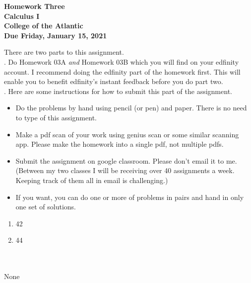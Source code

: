 \documentclass[12pt]{article}
\begin{document}
\pagestyle{empty}
 
\begin{center}
{\LARGE {\bf Homework Three}}\\
\bigskip
{\Large {\bf Calculus I}}\\
\bigskip
{\Large {\bf College of the Atlantic}}\\
\bigskip
{ {\bf Due Friday, January 15, 2021}}\\ 
\end{center}
\medskip


\noindent There are two parts to this assignment.\\

.  Do Homework 03A \emph{and} Homework
03B which you will find on your edfinity account.  I recommend doing
the edfinity part of the homework first.  This will enable you to
benefit edfinity's instant feedback before you do part two.\\ 


.  Here are some
instructions for how to submit this part of the assignment.
\begin{itemize}
\item Do the problems by hand using pencil (or pen) and paper.
  There is no need to type of this assignment.
\item Make a pdf scan of your work using genius scan or some
  similar scanning app.  Please make the homework into a single
  pdf, not multiple pdfs.
\item Submit the assignment on google classroom.  Please don't
  email it to me.  (Between my two classes I will be receiving
  over 40 assignments a week.  Keeping track of them all in email
  is challenging.)
\item If you want, you can do one or more of problems in pairs and hand 
  in only one set of solutions.\\
\end{itemize}


\begin{enumerate}
\setlength{\itemsep}{-1mm}
\item 42
\item 44
\end{enumerate}


\hspace{2mm}\\

\\

None

\end{document}
